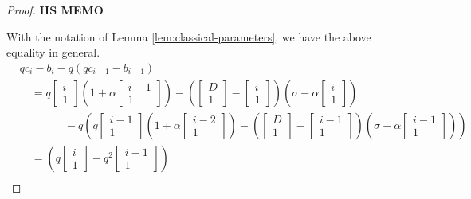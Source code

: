 \documentclass[
]{book}
\theoremstyle{definition}
\theoremstyle{definition}
\theoremstyle{definition}
\theoremstyle{definition}
\theoremstyle{remark}
\begin{document}
\begin{proof}
\textbf{HS MEMO}

With the notation of Lemma \ref{lem:classical-parameters}, we have the above equality in general.
\begin{align}
& qc_i-b_i - q(qc_{i-1}-b_{i-1})\\
& \quad = q\begin{bmatrix}{i}\\{1}\end{bmatrix}\left(1+\alpha \begin{bmatrix}{i-1}\\{1}\end{bmatrix}\right)-\left(\begin{bmatrix}{D}\\{1}\end{bmatrix}-\begin{bmatrix}{i}\\{1}\end{bmatrix}\right)\left(\sigma-\alpha\begin{bmatrix}{i}\\{1}\end{bmatrix}\right)\\
& \qquad\qquad -q\left(q\begin{bmatrix}{i-1}\\{1}\end{bmatrix}\left(1+\alpha\begin{bmatrix}{i-2}\\{1}\end{bmatrix}\right)-\left(\begin{bmatrix}{D}\\{1}\end{bmatrix}-\begin{bmatrix}{i-1}\\{1}\end{bmatrix}\right)\left(\sigma-\alpha\begin{bmatrix}{i-1}\\{1}\end{bmatrix}\right)\right)\\
& \quad = \left(q\begin{bmatrix}{i}\\{1}\end{bmatrix}-q^2\begin{bmatrix}{i-1}\\{1}\end{bmatrix}\right) \\

\end{align}
\end{proof}
\end{document}
